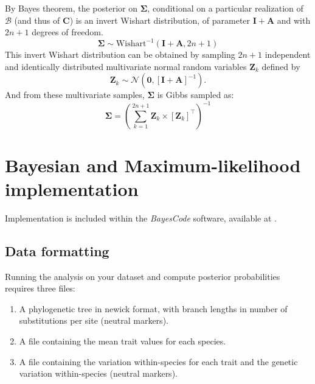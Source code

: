 \documentclass{article}
\newcommand{\MultiplyMatrix}{\times}
\newcommand{\UniDimArray}[1]{\bm{#1}}
\newcommand{\BiDimArray}[1]{\bm{#1}}
\newcommand{\tr}{^{\intercal}}
\newcommand{\inv}{^{-1}}
\newcommand{\NbrTaxa}{n}
\newcommand{\VecZero}{\UniDimArray{0}}
\newcommand{\WishartPostDf}{2 \NbrTaxa + 1}
\newcommand{\contrast}{\UniDimArray{C}}
\newcommand{\Covariancematrix}{\Sigma}
\newcommand{\CovarianceMatrix}{\BiDimArray{\Covariancematrix}}
\newcommand{\Identitymatrix}{\BiDimArray{I}}
\newcommand{\brownian}{\mathcal{B}}
\newcommand{\Brownian}{\UniDimArray{\brownian}}
\newcommand{\Scattermatrix}{\BiDimArray{A}}
\newcommand{\Multivariate}{\UniDimArray{Z}}
\begin{document}
By Bayes theorem, the {posterior} on $\CovarianceMatrix$, conditional on a particular realization of $\Brownian$ (and thus of $\contrast$) is an invert Wishart distribution, of parameter $\Identitymatrix + \Scattermatrix$ and with $\WishartPostDf$ degrees of freedom.
\begin{equation}
    \CovarianceMatrix \sim \text{Wishart}^{-1}\left( \Identitymatrix + \Scattermatrix, \WishartPostDf\right)\label{eq:bayes-posterior}
\end{equation}
This invert Wishart distribution can be obtained by sampling $\WishartPostDf$ independent and identically distributed multivariate normal random variables $\Multivariate_{k}$ defined by
\begin{equation}
    \Multivariate_{k} \sim \mathcal{N} \left( \VecZero, \left[ \Identitymatrix + \Scattermatrix\right]^{-1} \right).\label{eq:bayes-multivariate}
\end{equation}
And from these multivariate samples, $\CovarianceMatrix$ is Gibbs sampled as:
\begin{equation}
    \CovarianceMatrix = \left( \sum\limits_{k=1}^{\WishartPostDf} \Multivariate_{k} \MultiplyMatrix  \left[\Multivariate_{k} \right] \tr \right)\inv \label{eq:bayes-gibbs}
\end{equation}

\newpage
\section{Bayesian and Maximum-likelihood implementation}\label{sec:implementation}

Implementation is included within the \textit{BayesCode} software, available at .

\subsection{Data formatting}\label{subsec:data-formatting}

Running the analysis on your dataset and compute posterior probabilities requires three files:
\begin{enumerate}
    \item A phylogenetic tree in newick format, with branch lengths in number of substitutions per site (neutral markers).
    \item A file containing the mean trait values for each species.
    \item A file containing the variation within-species for each trait and the genetic variation within-species (neutral markers).
\end{enumerate}
\end{document}
